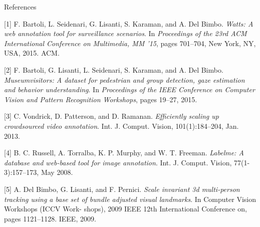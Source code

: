 \documentclass{beamer}
\begin{document}
\begin{tframe}{References}

\begin{scriptsize}

[1] F. Bartoli, L. Seidenari, G. Lisanti, S. Karaman, and A. Del Bimbo. \emph{Watts: A web annotation tool for surveillance scenarios}. In \emph{Proceedings of the 23rd ACM International Conference on Multimedia, MM ’15}, pages 701–704, New York, NY, USA, 2015. ACM.

\vspace{0.1in}

[2] F. Bartoli, G. Lisanti, L. Seidenari, S. Karaman, and A. Del Bimbo. \emph{Museumvisitors: A dataset for pedestrian and group detection, gaze estimation and behavior understanding}. In \emph{Proceedings of the IEEE Conference on Computer Vision and Pattern Recognition Workshops}, pages 19–27, 2015.

\vspace{0.1in}

[3] C. Vondrick, D. Patterson, and D. Ramanan. \emph{Efficiently scaling up crowdsourced video annotation}. Int. J. Comput. Vision, 101(1):184–204, Jan. 2013.

\vspace{0.1in}

[4] B. C. Russell, A. Torralba, K. P. Murphy, and W. T. Freeman. \emph{Labelme: A database and web-based tool for image annotation}. Int. J. Comput. Vision, 77(1-3):157–173, May 2008.


\vspace{0.1in}

[5] A. Del Bimbo, G. Lisanti, and F. Pernici. \emph{Scale invariant 3d multi-person tracking using a base set of bundle adjusted visual landmarks}. In Computer Vision Workshops (ICCV Work- shops), 2009 IEEE 12th International Conference on, pages 1121–1128. IEEE, 2009.

\end{scriptsize}

\end{tframe}
\end{document}
